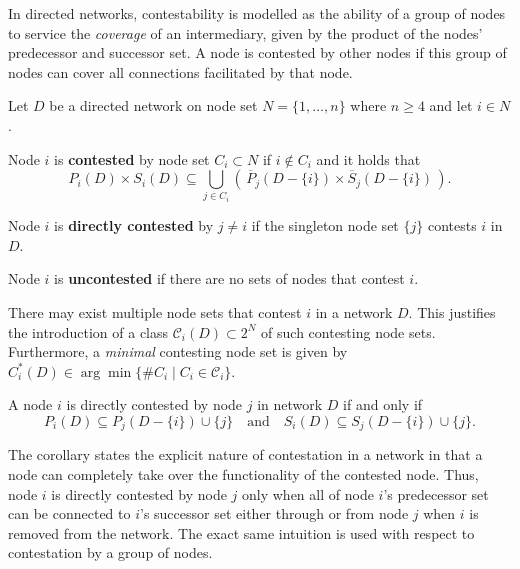In directed networks, contestability is modelled as the ability of a group of nodes to service the \emph{coverage} of an intermediary, given by the product of the nodes' predecessor and successor set. A node is contested by other nodes if this group of nodes can cover all connections facilitated by that node.

\begin{definition}[Contested] \label{Contested}
Let $D$ be a directed network on node set $N=\{1, \ldots ,n\}$ where $n \geqslant 4$ and let $i \in N$.
\begin{abet}
\item Node $i$ is \textbf{contested} by node set $C_{i} \subset N$ if $i \notin C_i$ and it holds that
\begin{equation} \label{Group Contested}
P_{i}(D) \times S_{i}(D) \subseteq \bigcup_{j \in C_{i}} \left( \, \overline{P}_{j}(D - \{i\}) \times \overline{S}_{j}(D - \{i\}) \, \right).
\end{equation}

\item Node $i$ is \textbf{directly contested} by $j \neq i$ if the singleton node set $\{ j \}$ contests $i$ in $D$.

\item Node $i$ is \textbf{uncontested} if there are no sets of nodes that contest $i$.
\end{abet}
\end{definition}

There may exist multiple node sets that contest $i$ in a network $D$. This justifies the introduction of a class $\mathcal{C}_i (D) \subset 2^N$ of such contesting node sets. Furthermore, a \emph{minimal} contesting node set is given by $C_{i}^{*}(D) \in \arg \min \{ \#C_{i} \mid C_{i} \in \mathcal{C}_{i} \}$.

\begin{corollary}
A node $i$ is directly contested by node $j$ in network $D$ if and only if\begin{equation} \label{Directly Contested}
P_{i}(D) \subseteq P_{j} (D - \{i\}) \cup \{j\} \quad \mbox{and} \quad S_{i} (D) \subseteq S_{j} (D - \{i\}) \cup \{j\}.
\end{equation}
\end{corollary}

The corollary states the explicit nature of contestation in a network in that a node can completely take over the functionality of the contested node. Thus, node $i$ is directly contested by node $j$ only when all of node $i$'s predecessor set can be connected to $i$'s successor set either through or from node $j$ when $i$ is removed from the network. The exact same intuition is used with respect to contestation by a group of nodes.

